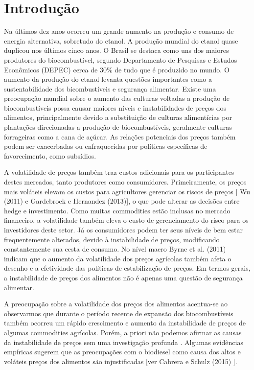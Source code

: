 \documentclass[a4paper,12pt] {article}
\begin{document}
	
	\section{Introdução}


Na últimos dez anos ocorreu um grande aumento na produção e consumo de energia alternativa, sobretudo do etanol. A produção mundial do etanol quase duplicou nos últimos cinco anos. O Brasil se destaca como uns dos maiores produtores do  biocombustível, segundo Departamento de Pesquisas e Estudos Econômicos (DEPEC) cerca de 30\%  de tudo que é produzido no mundo. O aumento da produção do etanol levanta questões importantes como a sustentabilidade dos bicombustíveis e  segurança alimentar. Existe uma preocupação mundial sobre o aumento das culturas voltadas a produção de biocombustíveis possa causar  maiores níveis e  instabilidades de preços dos alimentos, principalmente devido a substituição de culturas alimentícias por  plantações direcionadas a produção de biocombustíveis, geralmente culturas forrageiras como a cana de açúcar.   As relações potenciais dos preços também podem ser exacerbadas ou enfraquecidas por políticas específicas de favorecimento, como subsídios.

A volatilidade de preços também traz custos adicionais para os participantes destes  mercados, tanto produtores como consumidores. Primeiramente, os preços mais  voláteis  elevam os custos para agricultores gerenciar os riscos de preços [ Wu (2011) e Gardebroek e Hernandez (2013)], o que pode alterar as decisões entre hedge e investimento. Como muitas commodities estão inclusas no mercado financeiro, a volatilidade  também eleva o custo de gerenciamento do risco para os investidores deste setor.  Já os consumidores podem ter seus níveis de bem estar frequentemente alterados, devido à instabilidade de preços, modificando constantemente sua cesta de consumo. No nível macro Byrne et al. (2011) indicam que o aumento da volatilidade dos preços agrícolas também afeta o desenho e a efetividade das políticas de estabilização de preços. Em termos gerais, a instabilidade de preços dos alimentos não é apenas uma questão de segurança alimentar. 

 A preocupação sobre a volatilidade dos preços dos alimentos acentua-se ao observarmos que durante o período recente de  expansão dos biocombustíveis também ocorreu um rápido crescimento e aumento da instabilidade de preços  de algumas commodities agrícolas. Porém, a priori não podemos afirmar as causas da instabilidade de preços sem uma investigação profunda . Algumas evidências empíricas sugerem que as preocupações com o biodiesel como causa dos altos e voláteis  preços dos alimentos são injustificadas [ver  Cabrera e Schulz (2015) ].
 
\end{document}
